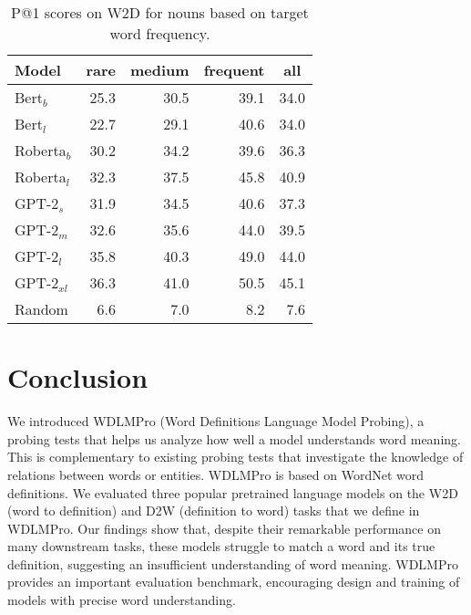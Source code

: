 \documentclass[11pt,a4paper]{article}
\begin{document}
\begin{table}
    \centering
    \begin{tabular}{l|rrrr}
    \hline
         \textbf{Model} & \multicolumn{1}{c}{\textbf{rare}} & \multicolumn{1}{c}{\textbf{medium}} & \multicolumn{1}{c}{\textbf{frequent}} & \multicolumn{1}{c}{\textbf{all}} \\ \hline
     Bert$_{b}$ & 25.3 & 30.5 & 39.1 & 34.0 \\
     Bert$_{l}$ & 22.7 & 29.1 & 40.6 & 34.0 \\
     Roberta$_{b}$ & 30.2 & 34.2 & 39.6 & 36.3 \\
     Roberta$_{l}$ & 32.3 & 37.5 & 45.8 & 40.9 \\ \hline
     GPT-2$_{s}$ & 31.9 & 34.5 & 40.6 & 37.3 \\
     GPT-2$_{m}$ & 32.6 & 35.6 & 44.0 & 39.5 \\
     GPT-2$_{l}$ & 35.8 & 40.3 & 49.0 & 44.0 \\
     GPT-2$_{xl}$ & 36.3 & 41.0 & 50.5 & 45.1 \\ \hline
     Random & 6.6 & 7.0 & 8.2 & 7.6 \\ \hline 
     
    \end{tabular}
    \caption{P@1 scores on W2D for nouns based on target word frequency.}
    \label{tab:freq_results_W2D}
\end{table}



\section{Conclusion}
We introduced
WDLMPro (Word Definitions Language Model
Probing),
a
probing tests that helps us analyze  how well a model
understands word meaning. This is complementary to existing
probing tests that investigate the knowledge of
relations between words or entities.
WDLMPro is based on WordNet word definitions.
We evaluated three popular pretrained language
models on the W2D (word to definition) and D2W (definition
to word) tasks that we define in WDLMPro. Our findings show
that, despite their remarkable performance on many
downstream tasks, these models struggle to match a word and
its true definition, suggesting an insufficient
understanding of word meaning. WDLMPro provides an important
evaluation benchmark, encouraging design and training of
models with precise word understanding.



\end{document}
